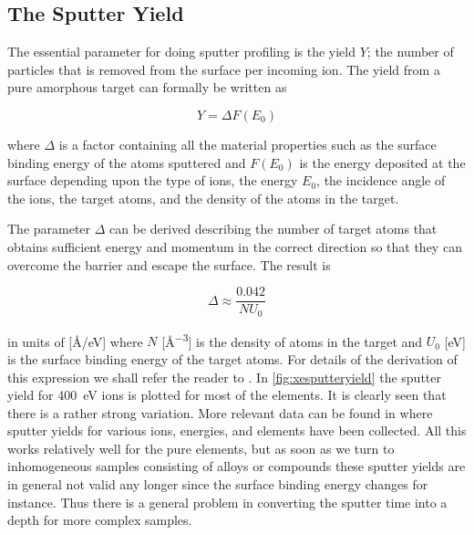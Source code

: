 \subsection{The Sputter Yield}
The essential parameter for doing sputter profiling is the yield $Y$; the number of particles that is removed from the surface per incoming ion. The yield from a pure amorphous target can formally be written as

\begin{equation}
Y=\Delta F(E_0)
\end{equation}

\noindent where $\Delta$ is a factor containing all the material properties such as the surface binding energy of the atoms sputtered and $F(E_0)$ is the energy deposited at the surface depending upon the type of ions, the energy $E_0$, the incidence angle of the ions, the target atoms, and the density of the atoms in the target.

The parameter $\Delta$ can be derived describing the number of target atoms that obtains sufficient energy and momentum in the correct direction so that they can overcome the barrier and escape the surface. The result is

\begin{equation}
\Delta\approx\frac{0.042}{NU_0}
\end{equation}

in units of [\si{\angstrom /\electronvolt}] where $N$ [\si{\angstrom ^{-3}}] is the density of atoms in the target and $U_0$ [\si{\electronvolt}] is the surface binding energy of the target atoms. For details of the derivation of this expression we shall refer the reader to \cite{sigmund}. In \autoref{fig:xesputteryield} the sputter yield for \SI{400}{\electronvolt}  ions is plotted for most of the elements. It is clearly seen that there is a rather strong variation. More relevant data can be found in \cite{behrisch} where sputter yields for various ions, energies, and elements have been collected. All this works relatively well for the pure elements, but as soon as we turn to inhomogeneous samples consisting of alloys or compounds these sputter yields are in general not valid any longer since the surface binding energy changes for instance. Thus there is a general problem in converting the sputter time into a depth for more complex samples.

